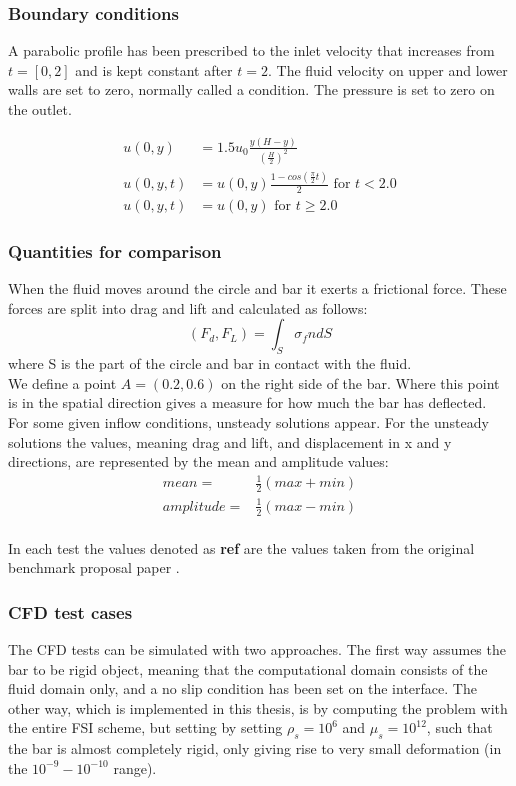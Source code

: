 \subsubsection*{Boundary conditions}
A parabolic profile has been prescribed to the inlet velocity that increases from $t=[0,2]$ and is kept constant after $t = 2$.
The fluid velocity on upper and lower walls are set to zero, normally called a  condition. The pressure is set to zero on the outlet.

\begin{align*}
u(0,y) &= 1.5u_0 \frac{y(H-y)}{(\frac{H}{2})^2}  \\
u(0,y,t) &= u(0,y)\frac{1-cos(\frac{\pi}{2}t)}{2} \text{  for  } t<2.0 \\
u(0,y,t) &= u(0,y) \text{  for  } t \geq 2.0
\end{align*}

\subsubsection*{Quantities for comparison}
When the fluid moves around the circle and bar it exerts a frictional force. These forces are split into drag and lift and calculated as follows:
$$ (F_d, F_L) = \int_S \sigma_f n dS $$ 
where S is the part of the circle and bar in contact with the fluid. \\
We define a point $A = (0.2,0.6)$ on the right side of the bar. Where this point is in the spatial direction gives a measure for how much the bar has deflected. \\
For some given inflow conditions, unsteady solutions appear. For the unsteady solutions the values, meaning drag and lift, and displacement in x and y directions, are represented by the mean and amplitude values:
\begin{align}
mean =& \frac{1}{2} (max + min) \\
amplitude =& \frac{1}{2} (max - min)\\
\end{align}

In each test the values denoted as \textbf{ref} are the values taken from the original benchmark proposal paper \cite{Hron2006a}. 

\subsubsection{CFD test cases}
The CFD tests can be simulated with two approaches. The first way assumes the bar to be rigid object, meaning that the computational domain consists of the fluid domain only, and a no slip condition has been set on the interface. The other way, which is implemented in this thesis, is by computing the problem with the entire FSI scheme, but setting by setting $\rho_s=10^{6}$ and $\mu_s=10^{12}$, such that the bar is almost completely rigid, only giving rise to very small deformation (in the $10^{-9}-10^{-10}$ range).



